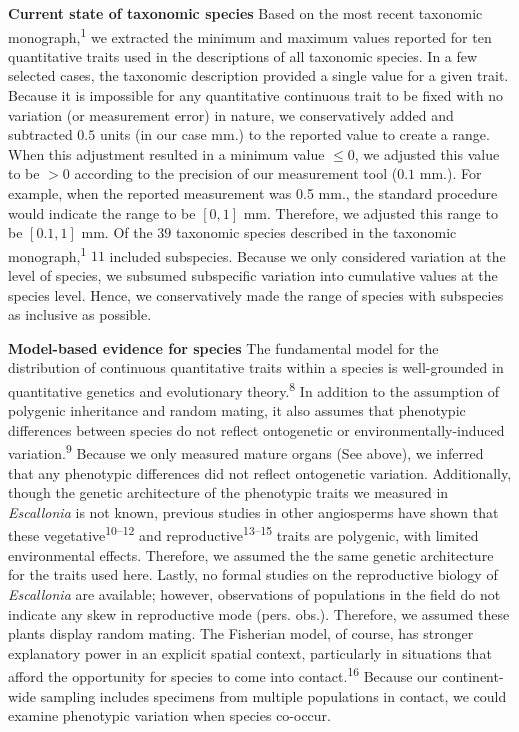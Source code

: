 \documentclass[
  11pt,
]{article}
\begin{document}
\textbf{Current state of taxonomic species} Based on the most recent taxonomic monograph,\textsuperscript{1} we extracted the minimum and maximum values reported for ten quantitative traits used in the descriptions of all taxonomic species. In a few selected cases, the taxonomic description provided a single value for a given trait. Because it is impossible for any quantitative continuous trait to be fixed with no variation (or measurement error) in nature, we conservatively added and subtracted \(0.5\) units (in our case mm.) to the reported value to create a range. When this adjustment resulted in a minimum value \(\leqslant 0\), we adjusted this value to be \(>0\) according to the precision of our measurement tool (\(0.1\) mm.). For example, when the reported measurement was 0.5 mm., the standard procedure would indicate the range to be \([0,1]\) mm. Therefore, we adjusted this range to be \([0.1,1]\) mm. Of the \(39\) taxonomic species described in the taxonomic monograph,\textsuperscript{1} \(11\) included subspecies. Because we only considered variation at the level of species, we subsumed subspecific variation into cumulative values at the species level. Hence, we conservatively made the range of species with subspecies as inclusive as possible.

\textbf{Model-based evidence for species} The fundamental model for the distribution of continuous quantitative traits within a species is well-grounded in quantitative genetics and evolutionary theory.\textsuperscript{8} In addition to the assumption of polygenic inheritance and random mating, it also assumes that phenotypic differences between species do not reflect ontogenetic or environmentally-induced variation.\textsuperscript{9} Because we only measured mature organs (See above), we inferred that any phenotypic differences did not reflect ontogenetic variation. Additionally, though the genetic architecture of the phenotypic traits we measured in \emph{Escallonia} is not known, previous studies in other angiosperms have shown that these vegetative\textsuperscript{10--12} and reproductive\textsuperscript{13--15} traits are polygenic, with limited environmental effects. Therefore, we assumed the the same genetic architecture for the traits used here. Lastly, no formal studies on the reproductive biology of \emph{Escallonia} are available; however, observations of populations in the field do not indicate any skew in reproductive mode (pers. obs.). Therefore, we assumed these plants display random mating. The Fisherian model, of course, has stronger explanatory power in an explicit spatial context, particularly in situations that afford the opportunity for species to come into contact.\textsuperscript{16} Because our continent-wide sampling includes specimens from multiple populations in contact, we could examine phenotypic variation when species co-occur.
\end{document}

